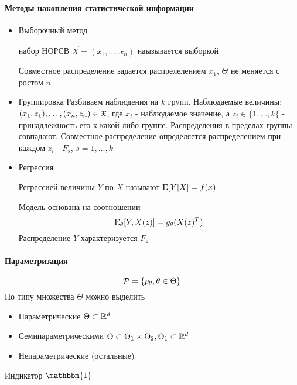 \documentclass[main.tex]{subfiles}
\begin{document}
\paragraph{Методы накопления статистической информации}
\begin{itemize}
	\item Выборочный метод
	\begin{definition}[Выборка]
		набор НОРСВ $\vec{X}=(x_1,\dots,x_n)$ наызывается выборкой
	\end{definition}
	Совместное распределение задается распрелелением $x_1$,  $\Theta$ не меняется с ростом $n$
	\item Группировка\newline
	Разбиваем наблюдения на $k$ групп. Наблюдаемые величины: $(x_1,z_1),\dots,(x_n,z_n)\in\mathfrak{X}$, где $x_i$ - наблюдаемое значение, а $z_i \in \{1,\dots,k\{$ - принадлежность его к какой-либо группе. Распределения в пределах группы совпадают. Совместное распределение определяется распределением при каждом $z_i$ - $F_s$, $s=1,\dots,k$
	\item Регрессия
	\begin{definition}[Регрессия]
		Регрессией величины $Y$ по $X$ называют $\mathrm{E}[Y|X]=f(x)$
	\end{definition}
	Модель основана на соотношении $$\mathrm{E}_\theta[Y,X(z)]=g_\theta(X(z)^T)$$
	Распределение $Y$ характеризуется $F_z$

\end{itemize}

\paragraph{Параметризация}
$$\mathcal{P}=\{p_\theta,\theta\in\Theta\}$$
По типу множества $\Theta$ можно выделить
\begin{itemize}
	\item Параметрические $\Theta \subset \mathbb{R}^d$
	\item Семипараметрическими $\Theta \subset \Theta_1\times\Theta_2, \Theta_1\subset\mathbb{R}^d$
	\item Непараметрические (остальные)
\end{itemize}

Индикатор $\mathbbm{1}$
\end{document}
